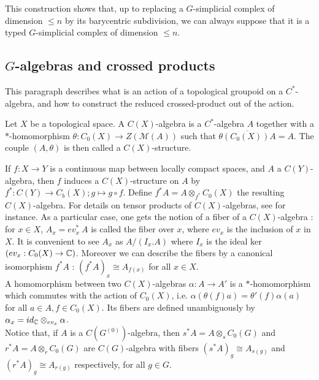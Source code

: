 This construction shows that, up to replacing a $G$-simplicial complex of dimension $\leq n$ by its barycentric subdivision, we can always suppose that it is a typed $G$-simplicial complex of dimension $\leq n$.

\subsection{$G$-algebras and crossed products}

This paragraph describes what is an action of a topological groupoid on a $C^*$-algebra, and how to construct the reduced crossed-product out of the action.

\begin{definition}
Let $X$ be a topological space. A $C(X)$-algebra is a $C^*$-algebra $A$ together with a $*$-homomorphism $\theta : C_0(X)\rightarrow Z(\mathcal M(A))$ such that $\overline{\theta (C_0(X)) A} = A$. The couple $(A,\theta)$ is then called a $C(X)$-structure.
\end{definition} 

If $f : X\rightarrow Y$ is a continuous map between locally compact spaces, and $A$ a $C(Y)$-algebra, then $f$ induces a $C(X)$-structure on $A$ by $f^* : C(Y) \rightarrow C_b(X); g\mapsto g\circ f$. Define $f^* A = A \otimes_{f^*} C_0(X)$ the resulting $C(X)$-algebra. For details on tensor products of $C(X)$-algebras, see \cite{LeGall} for instance. As a particular case, one gets the notion of a fiber of a $C(X)$-algebra : for $x\in X$, $A_x = ev_x^* \ A$ is called the fiber over $x$, where $ev_x$ is the inclusion of $x$ in $X$. It is convenient to see $A_x$ as $A/ (I_x .A)$ where $I_x$ is the ideal ker $(ev_x : C_0(X) \rightarrow \mathbb C)$. Moreover we can describe the fibers by a canonical isomorphism $f^*A$ : $(f^*A)_x \cong A_{f(x)}$ for all $x\in X$.\\

A homomorphism between two $C(X)$-algebras $\alpha : A\rightarrow A'$ is a $*$-homomorphism which commutes with the action of $C_0(X)$, i.e. $\alpha(\theta(f)a)=\theta'(f)\alpha(a)$ for all $a\in A,f\in C_0(X)$. Its fibers are defined unambiguously by $\alpha_x = id_\mathbb C \otimes_{ev_x} \alpha$.\\

Notice that, if $A$ is a $C(G^{(0)})$-algebra, then $s^* A = A \otimes_s C_0(G)$ and $r^* A = A \otimes_r C_0(G)$ are $C(G)$-algebra with fibers $(s^*A)_g \cong A_{s(g)}$ and $(r^*A)_g \cong A_{r(g)}$ respectively, for all $g\in G$.

